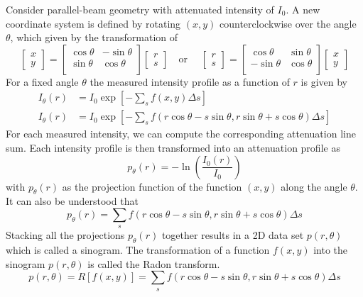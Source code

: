 \documentclass[../../../main.tex]{subfiles}
\begin{document}
Consider parallel-beam geometry with attenuated intensity of $I_0$.
A new coordinate system is defined by rotating $(x,y)$ counterclockwise over the angle $\theta$, which given by the transformation of
\begin{equation*}
    \begin{bmatrix}
        x \\y
    \end{bmatrix}
    =
    \begin{bmatrix}
        \cos \theta & -\sin \theta \\
        \sin \theta & \cos \theta  \\
    \end{bmatrix}
    \begin{bmatrix}
        r \\s
    \end{bmatrix}
    \quad \text{or }\quad
    \begin{bmatrix}
        r \\s
    \end{bmatrix}
    =
    \begin{bmatrix}
        \cos \theta  & \sin \theta \\
        -\sin \theta & \cos \theta \\
    \end{bmatrix}
    \begin{bmatrix}
        x \\y
    \end{bmatrix}
\end{equation*}
For a fixed angle $\theta$ the measured intensity profile as a function of $r$ is given by
\begin{align*}
    I_\theta(r) & = I_0 \exp \left[ -\sum_s f(x,y)\Delta s \right]                                                                    \\
    I_\theta(r) & = I_0 \exp \left[ -\sum_s f \left( r \cos \theta-s \sin \theta,r \sin \theta+s \cos \theta \right) \Delta s \right]
\end{align*}
For each measured intensity, we can compute the corresponding attenuation line sum.
Each intensity profile is then transformed into an attenuation profile as
\begin{equation*}
    p_\theta(r)=-\ln \left(  \frac{I_0(r )}{I_0}\right)
\end{equation*}
with $p_\theta(r)$ as the projection function of the function $(x,y)$ along the angle $\theta$.
It can also be understood that
\begin{equation*}
    p_\theta(r)=\sum_s f \left( r \cos \theta-s \sin \theta,r \sin \theta+s \cos \theta \right) \Delta s
\end{equation*}
Stacking all the projections $p_\theta(r)$ together results in a 2D data set $p(r,\theta)$ which is called a sinogram.
The transformation of a function $f(x,y)$ into the sinogram $p(r,\theta)$ is called the Radon transform.
\begin{equation*}
    p(r,\theta)=R \left[ f(x,y) \right]=\sum_s f \left( r \cos \theta-s \sin \theta,r \sin \theta+s \cos \theta \right) \Delta s
\end{equation*}
\end{document}
